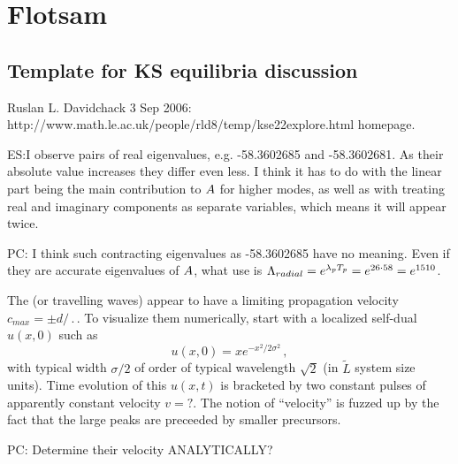 %

\section{Flotsam}

\subsection{Template for KS equilibria discussion}

Ruslan L. Davidchack 3 Sep 2006:
http://www.math.le.ac.uk/people/rld8/temp/kse22explore.html homepage.


ES:{I observe pairs of real eigenvalues,
e.g. -58.3602685 and -58.3602681. As their absolute
value increases they differ even less.
I think it has to do with the linear part being the main
contribution to $A$ for higher modes, as well as
with treating real and imaginary components
as separate variables, which means it will appear twice.
        }

PC: {I think such contracting eigenvalues as -58.3602685 have no meaning.
Even if they are accurate eigenvalues of $A$,
what use is
$\Lambda_{radial} =  e^{\lambda_p {T_{p}}} = e^{26\cdot58} = e^{1510}$.
        }

The \reqva (or travelling waves) appear to have a limiting propagation
velocity $c_{max} = \pm d/\period{}$.
To visualize them numerically,
start with a localized self-dual $u(x,0)$ such as
\[
u(x,0) = x e^{- x^2/2\sigma^2}
\,,
\]
with typical width $\sigma/2$ of order of typical wavelength
$\sqrt{2}$ (in $\tilde{L}$ system size units).
Time evolution of this  $u(x,t)$ is bracketed by two constant
pulses of apparently constant velocity $v=?$.
The notion of ``velocity''
is fuzzed up by the fact that the large peaks are preceeded
by smaller precursors.

PC: {Determine their velocity ANALYTICALLY?}

